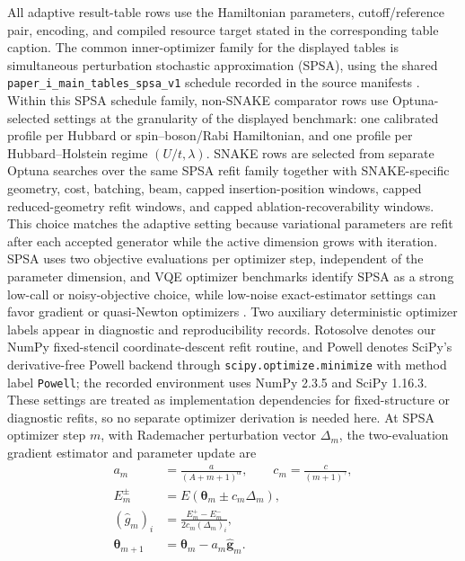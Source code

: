 \documentclass[
  reprint,
  amsmath,
  amssymb,
  aps,
  pra,
  nofootinbib,
  superscriptaddress,
  floatfix
]{revtex4-2}
\begin{document}
All adaptive result-table rows use the Hamiltonian parameters, cutoff/reference pair,
encoding, and compiled resource target stated in the corresponding table
caption. The common inner-optimizer family for the displayed tables is simultaneous
perturbation stochastic approximation (SPSA), using the shared
\texttt{paper\_i\_main\_tables\_spsa\_v1} schedule recorded in the source
manifests \cite{Spall1992SPSA,Kandala2017}. Within this SPSA schedule family,
non-SNAKE comparator rows use Optuna-selected settings at the granularity of the
displayed benchmark: one calibrated profile per Hubbard or spin--boson/Rabi
Hamiltonian, and one profile per Hubbard--Holstein regime \((U/t,\lambda)\).
SNAKE rows are selected from separate Optuna searches over the same SPSA refit
family together with SNAKE-specific geometry, cost, batching, beam,
capped insertion-position windows, capped reduced-geometry refit windows, and
capped ablation-recoverability windows. This choice matches the adaptive
setting because variational parameters are refit after each accepted generator
while the active dimension grows with iteration. SPSA uses two objective
evaluations per optimizer step, independent of the parameter dimension, and VQE
optimizer benchmarks identify SPSA as a strong low-call or noisy-objective
choice, while low-noise exact-estimator settings can favor gradient or
quasi-Newton optimizers
\cite{BonetMonroig2023Optimizer,Singh2023Optimizers,Jones2025FermiHubbardOptimizers}.
Two auxiliary deterministic optimizer labels appear in diagnostic and
reproducibility records. Rotosolve denotes our NumPy fixed-stencil
coordinate-descent refit routine, and Powell denotes SciPy's derivative-free
Powell backend through \texttt{scipy.optimize.minimize} with method label
\texttt{Powell}; the recorded environment uses NumPy 2.3.5 and SciPy 1.16.3.
These settings are treated as implementation dependencies for fixed-structure
or diagnostic refits, so no separate optimizer derivation is needed here.
At SPSA optimizer step \(m\), with
Rademacher perturbation vector \(\Delta_m\), the two-evaluation gradient
estimator and parameter update are
\begin{align}
a_m&=\frac{a}{(A+m+1)^\alpha},\qquad
c_m=\frac{c}{(m+1)^\gamma}, \nonumber\\
E_m^\pm&=E(\boldsymbol{\theta}_m\pm c_m\Delta_m), \nonumber\\
(\widehat g_m)_i&=\frac{E_m^+-E_m^-}{2c_m(\Delta_m)_i}, \nonumber\\
\boldsymbol{\theta}_{m+1}&=\boldsymbol{\theta}_m-a_m\widehat{\mathbf g}_m .
\label{eq:spsa_inner_optimizer}
\end{align}
\end{document}
